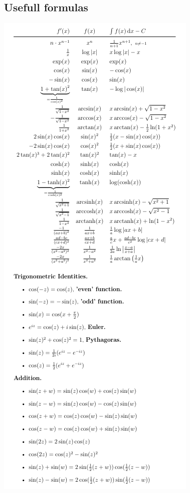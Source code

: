 \documentclass[8pt]{article}
\begin{document}
\begin{multicols*}{3}
  \section{Usefull formulas}
    \begin{minipage}{\linewidth-2cm}
      \includegraphics[width=\linewidth]{./media/Useful_Integrals_and_Identities_1.png}

\end{minipage}
\end{multicols*}
\end{document}
